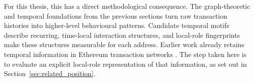 For this thesis, this has a direct methodological consequence. The graph-theoretic
and temporal foundations from the previous sections turn raw transaction
histories into higher-level behavioural patterns. Candidate temporal motifs
describe recurring, time-local interaction structures, and local-role
fingerprints make these structures measurable for each address. Earlier work
already retains temporal information in Ethereum transaction networks
\citep{wu2020temporal}. The step taken here is to evaluate an explicit local-role
representation of that information, as set out in
Section~\ref{sec:related_position}.
